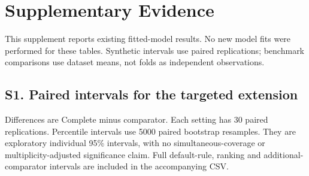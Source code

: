 \section*{Supplementary Evidence}
This supplement reports existing fitted-model results. No new model fits were performed for these tables. Synthetic intervals use paired replications; benchmark comparisons use dataset means, not folds as independent observations.
\subsection*{S1. Paired intervals for the targeted extension}
Differences are Complete minus comparator. Each setting has 30 paired replications. Percentile intervals use 5000 paired bootstrap resamples. They are exploratory individual 95\% intervals, with no simultaneous-coverage or multiplicity-adjusted significance claim. Full default-rule, ranking and additional-comparator intervals are included in the accompanying CSV.

